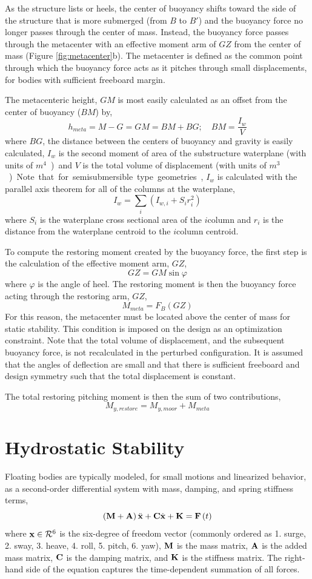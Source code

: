As the structure lists or heels, the center of buoyancy shifts toward
the side of the structure that is more submerged (from $B$ to $B'$) and
the buoyancy force no longer passes through the center of mass.
Instead, the buoyancy force passes through the metacenter with an
effective moment arm of $GZ$ from the center of mass (Figure
\ref{fig:metacenter}b).  The metacenter is defined as the common point
through which the buoyancy force acts as it pitches through small
displacements, for bodies with sufficient freeboard margin.

The metacenteric height, $GM$ is most easily calculated as an offset from the
center of buoyancy ($BM$) by,
\[
  h_{meta} = M - G = GM = BM + BG;\quad BM = \frac{I_w}{V}
\]
where $BG$, the distance between the centers of buoyancy and gravity is
easily calculated, $I_w$ is the second moment of area of the substructure waterplane
(with units of \unit{$m^4$}) and $V$ is the total volume of displacement
(with units of \unit{$m^3$}).  Note that for semisubmersible type
geometries, $I_w$ is calculated with the parallel axis theorem for all
of the columns at the waterplane,
\[
  I_w = \sum_i \left( I_{w,i} + S_ir_i^2 \right)
\]
where $S_i$ is the waterplane cross sectional area of the $i$\th column and $r_i$
is the distance from the waterplane centroid to the $i$\th column centroid.

To compute the restoring moment created by the buoyancy force, the first
step is the calculation of the effective moment arm, $GZ$,
\[
GZ = GM \sin \varphi
\]
where $\varphi$ is the angle of heel.  The restoring moment is then the
buoyancy force acting through the restoring arm, $GZ$,
\[
  M_{meta} = F_B \left(GZ\right)
\]
For this reason, the metacenter must be located above the center of mass
for static stability.  This condition is imposed on the design as an
optimization constraint.  Note that the total volume of displacement,
and the subsequent buoyancy force, is not recalculated in the perturbed
configuration.  It is assumed that the angles of deflection are small
and that there is sufficient freeboard and design symmetry such that the
total displacement is constant.

The total restoring pitching moment is then the sum of two
contributions,
\[
  M_{y,restore} = M_{y,moor} + M_{meta}
\]

\section{Hydrostatic Stability}
Floating bodies are typically modeled, for small motions and linearized
behavior, as a second-order differential system with mass, damping, and
spring stiffness terms,
\[
  \left(\mathbf{M} + \mathbf{A}\right)\ddot{\mathbf{x}} + \mathbf{C}\dot{\mathbf{x}} +
  \mathbf{K} = \mathbf{F}\left( t \right)
\]
where $\mathbf{x}\in\mathcal{R}^6$ is the six-degree of freedom vector
(commonly ordered as 1. surge, 2. sway, 3. heave, 4. roll, 5. pitch,
6. yaw), $\mathbf{M}$ is the mass matrix, $\mathbf{A}$ is the added mass
matrix, $\mathbf{C}$ is the damping matrix, and $\mathbf{K}$ is the stiffness
matrix.  The right-hand side of the equation captures the time-dependent
summation of all forces.

